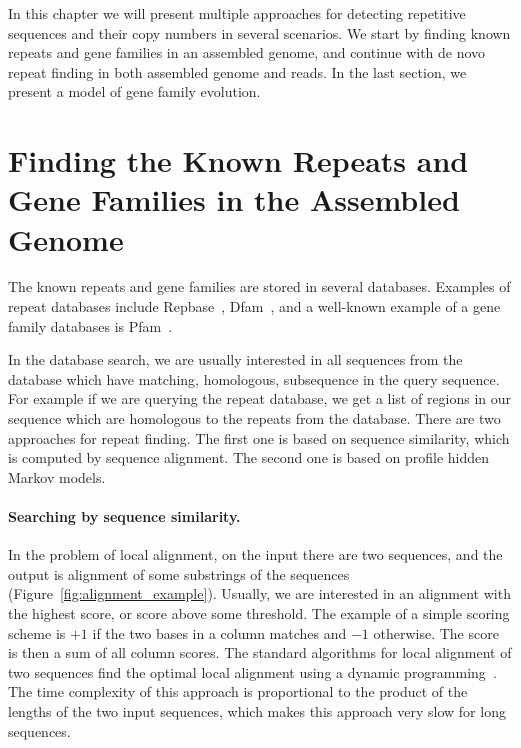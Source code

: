 In this chapter we will present multiple approaches for detecting repetitive sequences and their copy numbers in several scenarios. We start by finding known repeats and gene families in an assembled genome, and continue with de novo repeat finding in both assembled genome and reads. In the last section, we present a model of gene family evolution.

\section{Finding the Known Repeats and Gene Families in the Assembled Genome}

The known repeats and gene families are stored in several databases. Examples of repeat databases include Repbase~\cite{repbase}, Dfam~\cite{dfam}, and a well-known example of a gene family databases is Pfam~\cite{pfam}.

In the database search, we are usually interested in all sequences from the database which have matching, homologous, subsequence in the query sequence. For example if we are querying the repeat database, we get a list of regions in our sequence which are homologous to the repeats from the database.
There are two approaches for repeat finding. The first one is based on sequence similarity, which is computed by sequence alignment. The second one is based on profile hidden Markov models.

\paragraph{Searching by sequence similarity.}
In the problem of local alignment, on the input there are two sequences, and the output is alignment of some substrings of the sequences (Figure~\ref{fig:alignment_example}). Usually, we are interested in an alignment with the highest score, or score above some threshold.
The example of a simple scoring scheme is $+1$ if the two bases in a column matches and $-1$ otherwise. The score is then a sum of all column scores.
The standard algorithms for local alignment of two sequences find the optimal local alignment using a dynamic programming~\cite{durbin}. The time complexity of this approach is proportional to the product of the lengths of the two input sequences, which makes this approach very slow for long sequences.

